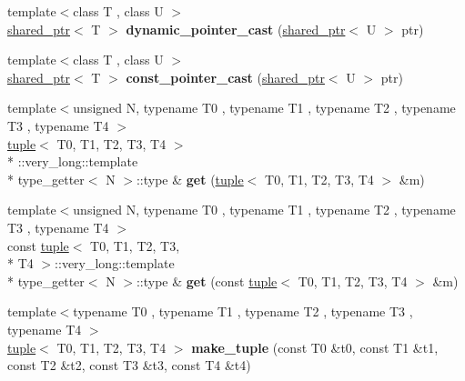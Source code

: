 \begin{DoxyCompactItemize}
\item 
\hypertarget{namespaceboost_af6d52db28eddfb0ad1b964b2a2dac3b8}{{\footnotesize template$<$class T , class U $>$ }\\\hyperlink{classboost_1_1shared__ptr}{shared\+\_\+ptr}$<$ T $>$ {\bfseries dynamic\+\_\+pointer\+\_\+cast} (\hyperlink{classboost_1_1shared__ptr}{shared\+\_\+ptr}$<$ U $>$ ptr)}\label{namespaceboost_af6d52db28eddfb0ad1b964b2a2dac3b8}

\item 
\hypertarget{namespaceboost_a66eac91dd9127eaaf0fc17b3d73d7b82}{{\footnotesize template$<$class T , class U $>$ }\\\hyperlink{classboost_1_1shared__ptr}{shared\+\_\+ptr}$<$ T $>$ {\bfseries const\+\_\+pointer\+\_\+cast} (\hyperlink{classboost_1_1shared__ptr}{shared\+\_\+ptr}$<$ U $>$ ptr)}\label{namespaceboost_a66eac91dd9127eaaf0fc17b3d73d7b82}

\item 
\hypertarget{namespaceboost_a5feeb35175b47e4ed31470e079fffd7f}{{\footnotesize template$<$unsigned N, typename T0 , typename T1 , typename T2 , typename T3 , typename T4 $>$ }\\\hyperlink{classboost_1_1tuple}{tuple}$<$ T0, T1, T2, T3, T4 $>$\\*
\+::very\+\_\+long\+::template \\*
type\+\_\+getter$<$ N $>$\+::type \& {\bfseries get} (\hyperlink{classboost_1_1tuple}{tuple}$<$ T0, T1, T2, T3, T4 $>$ \&m)}\label{namespaceboost_a5feeb35175b47e4ed31470e079fffd7f}

\item 
\hypertarget{namespaceboost_ad06b1589967e67bf9ce2cefc71f0d284}{{\footnotesize template$<$unsigned N, typename T0 , typename T1 , typename T2 , typename T3 , typename T4 $>$ }\\const \hyperlink{classboost_1_1tuple}{tuple}$<$ T0, T1, T2, T3, \\*
T4 $>$\+::very\+\_\+long\+::template \\*
type\+\_\+getter$<$ N $>$\+::type \& {\bfseries get} (const \hyperlink{classboost_1_1tuple}{tuple}$<$ T0, T1, T2, T3, T4 $>$ \&m)}\label{namespaceboost_ad06b1589967e67bf9ce2cefc71f0d284}

\item 
\hypertarget{namespaceboost_abbd33c0dfe4c5a67cd0f21dcabaf220c}{{\footnotesize template$<$typename T0 , typename T1 , typename T2 , typename T3 , typename T4 $>$ }\\\hyperlink{classboost_1_1tuple}{tuple}$<$ T0, T1, T2, T3, T4 $>$ {\bfseries make\+\_\+tuple} (const T0 \&t0, const T1 \&t1, const T2 \&t2, const T3 \&t3, const T4 \&t4)}\label{namespaceboost_abbd33c0dfe4c5a67cd0f21dcabaf220c}


\end{DoxyCompactItemize}
